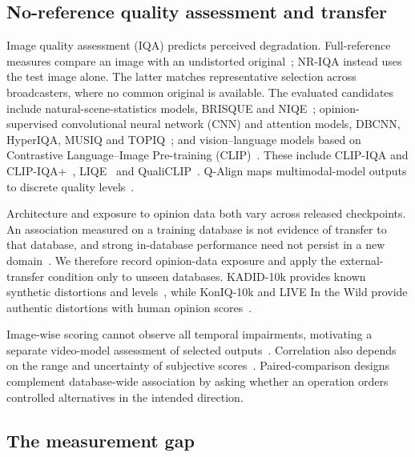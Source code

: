 \subsection{No-reference quality assessment and transfer}

Image quality assessment (IQA) predicts perceived degradation. Full-reference measures compare an image with an undistorted original~\citep{wang2004ssim,zhai2020iqa_survey}; NR-IQA instead uses the test image alone. The latter matches representative selection across broadcasters, where no common original is available. The evaluated candidates include natural-scene-statistics models, BRISQUE and NIQE~\citep{mittal2012brisque,mittal2013niqe}; opinion-supervised convolutional neural network (CNN) and attention models, DBCNN, HyperIQA, MUSIQ and TOPIQ~\citep{chen2024topiq,ke2021musiq,su2020hyperiqa,zhang2020dbcnn}; and vision--language models based on Contrastive Language--Image Pre-training (CLIP)~\citep{radford2021clip}. These include CLIP-IQA and CLIP-IQA+~\citep{wang2023clipiqa}, LIQE~\citep{zhang2023liqe} and QualiCLIP~\citep{agnolucci2024qualiclip}. Q-Align maps multimodal-model outputs to discrete quality levels~\citep{wu2024qalign}.

Architecture and exposure to opinion data both vary across released checkpoints. An association measured on a training database is not evidence of transfer to that database, and strong in-database performance need not persist in a new domain~\citep{cao2024datacentric,pinson2023nrbroadcast}. We therefore record opinion-data exposure and apply the external-transfer condition only to unseen databases. KADID-10k provides known synthetic distortions and levels~\citep{lin2019kadid}, while KonIQ-10k and LIVE In the Wild provide authentic distortions with human opinion scores~\citep{ghadiyaram2016clive,hosu2020koniq}.

Image-wise scoring cannot observe all temporal impairments, motivating a separate video-model assessment of selected outputs~\citep{huang2023xgcvqa,wang2021uvq,wu2023dover}. Correlation also depends on the range and uncertainty of subjective scores~\citep{krasula2016methodology}. Paired-comparison designs~\citep{behzadpour2023precision,isogawa2019inpainted,oszust2017lasso} complement database-wide association by asking whether an operation orders controlled alternatives in the intended direction. 

\subsection{The measurement gap}

